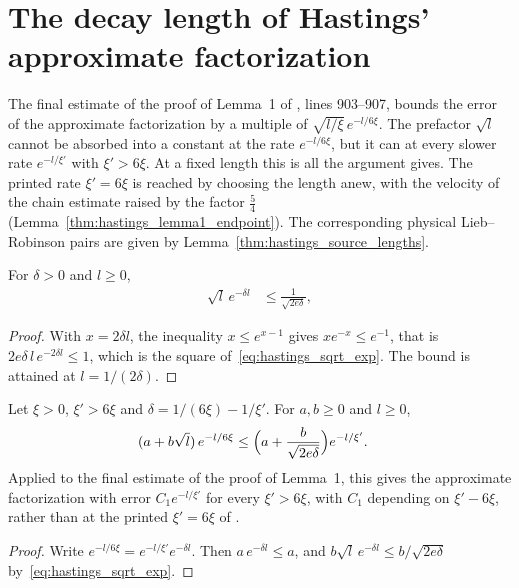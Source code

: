 \section{The decay length of Hastings' approximate factorization}
\label{sec:hastings_decay_slack}


The final estimate of the proof of Lemma~1 of \cite{Hastings2007AreaLaw},
lines 903--907, bounds the error of the approximate factorization by a
multiple of $\sqrt{l/\xi}\,e^{-l/6\xi}$. The prefactor $\sqrt l$ cannot be
absorbed into a constant at the rate $e^{-l/6\xi}$, but it can at every
slower rate $e^{-l/\xi'}$ with $\xi'>6\xi$. At a fixed length this is all
the argument gives. The printed rate $\xi'=6\xi$ is reached by choosing the
length anew, with the velocity of the chain estimate raised by the factor
$\tfrac54$ (Lemma~\ref{thm:hastings_lemma1_endpoint}). The corresponding
physical Lieb--Robinson pairs are given by
Lemma~\ref{thm:hastings_source_lengths}.

\begin{lemma}
    \label{thm:hastings_sqrt_exp}
    \leanok
    For $\delta>0$ and $l\ge0$,
    \begin{align}
        \sqrt l\,e^{-\delta l} & \le\frac1{\sqrt{2e\delta}},
        \label{eq:hastings_sqrt_exp}
    \end{align}
\end{lemma}
\begin{proof}\leanok
    With $x=2\delta l$, the inequality $x\le e^{x-1}$ gives $xe^{-x}\le e^{-1}$,
    that is $2e\delta\,l\,e^{-2\delta l}\le1$, which is the square
    of~\eqref{eq:hastings_sqrt_exp}. The bound is attained at $l=1/(2\delta)$.
\end{proof}

\begin{lemma}
    \label{thm:hastings_decay_slack}
    \leanok
    Let $\xi>0$, $\xi'>6\xi$ and $\delta=1/(6\xi)-1/\xi'$. For $a,b\ge0$ and
    $l\ge0$,
    \begin{align}
        (a+b\sqrt l)\,e^{-l/6\xi} & \le\Bigl(a+\frac{b}{\sqrt{2e\delta}}\Bigr)e^{-l/\xi'}.
        \label{eq:hastings_decay_slack}
    \end{align}
    Applied to the final estimate of the proof of Lemma~1, this gives the
    approximate factorization with error $C_1e^{-l/\xi'}$ for every
    $\xi'>6\xi$, with $C_1$ depending on $\xi'-6\xi$, rather than at the
    printed $\xi'=6\xi$ of \cite[lines 141--142]{Hastings2007AreaLaw}.
\end{lemma}
\begin{proof}\leanok
    Write $e^{-l/6\xi}=e^{-l/\xi'}e^{-\delta l}$. Then $a\,e^{-\delta l}\le a$,
    and $b\sqrt l\,e^{-\delta l}\le b/\sqrt{2e\delta}$
    by~\eqref{eq:hastings_sqrt_exp}.
\end{proof}

